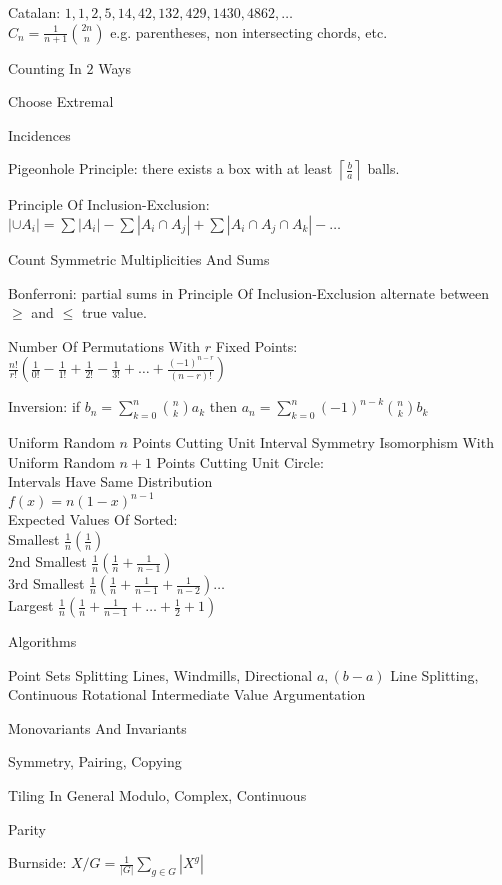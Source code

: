 Catalan: $1,1,2,5,14,42,132,429,1430,4862,\dots$ \\
$C_n = \frac{1}{n+1} \binom{2n}{n}$ e.g. parentheses, non intersecting chords, etc.

Counting In $2$ Ways

Choose Extremal

Incidences

Pigeonhole Principle: there exists a box with at least $\left\lceil \frac{b}{a} \right\rceil$ balls.

Principle Of Inclusion-Exclusion: $| \cup A_i | = \sum |A_i| - \sum |A_i \cap A_j| + \sum |A_i \cap A_j \cap A_k| - \dots$

Count Symmetric Multiplicities And Sums

Bonferroni: partial sums in Principle Of Inclusion-Exclusion alternate between $\ge$ and $\le$ true value.

Number Of Permutations With $r$ Fixed Points: $\frac{n!}{r!}(\frac{1}{0!} - \frac{1}{1!} + \frac{1}{2!} - \frac{1}{3!} + \dots + \frac{(-1)^{n-r}}{(n-r)!})$

Inversion: if $b_n = \sum_{k=0}^n \binom{n}{k} a_k$ then $a_n = \sum_{k=0}^n (-1)^{n-k} \binom{n}{k} b_k$

Uniform Random $n$ Points Cutting Unit Interval Symmetry Isomorphism With Uniform Random $n+1$ Points Cutting Unit Circle: \\
Intervals Have Same Distribution \\
$f(x)=n(1-x)^{n-1}$ \\
Expected Values Of Sorted: \\
Smallest $\frac{1}{n} \left(\frac{1}{n} \right)$ \\
$2$nd Smallest $\frac{1}{n} \left(\frac{1}{n}+\frac{1}{n-1} \right)$ \\
$3$rd Smallest $\frac{1}{n} \left(\frac{1}{n}+\frac{1}{n-1}+\frac{1}{n-2} \right) \dots$ \\
Largest $\frac{1}{n} \left(\frac{1}{n}+\frac{1}{n-1}+\dots+\frac{1}{2}+1 \right)$

Algorithms

Point Sets Splitting Lines, Windmills, Directional $a,(b-a)$ Line Splitting, Continuous Rotational Intermediate Value Argumentation

Monovariants And Invariants

Symmetry, Pairing, Copying

Tiling In General Modulo, Complex, Continuous

Parity

Burnside: $X / G = \frac{1}{|G|} \sum_{g \in G} |X^g|$

